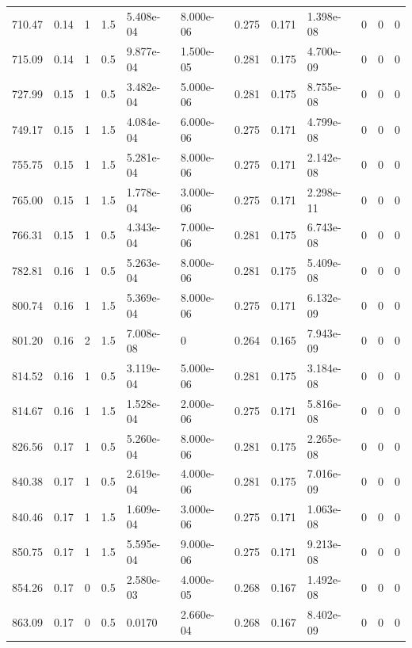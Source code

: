 \documentclass[preview]{standalone}
\begin{document}
{{{\begin{tabular}{L{1.2cm}C{1.2cm} C{0.3cm}C{0.5cm} C{1.4cm}C{1.4cm} C{1.4cm}C{1.4cm} C{1.6cm}C{1.6cm} C{1.6cm}C{1.6cm}}
  710.47  &  0.14  & 1     & 1.5 &  5.408e-04  & 8.000e-06  &  0.275&   0.171& 1.398e-08 & 0   &  0 & 0  \\ 
  715.09  &  0.14  & 1     & 0.5 &  9.877e-04  & 1.500e-05  &  0.281&   0.175& 4.700e-09 & 0   &  0 & 0  \\ 
  727.99  &  0.15  & 1     & 0.5 &  3.482e-04  & 5.000e-06  &  0.281&   0.175& 8.755e-08 & 0   &  0 & 0  \\ 
  749.17  &  0.15  & 1     & 1.5 &  4.084e-04  & 6.000e-06  &  0.275&   0.171& 4.799e-08 & 0   &  0 & 0  \\ 
  755.75  &  0.15  & 1     & 1.5 &  5.281e-04  & 8.000e-06  &  0.275&   0.171& 2.142e-08 & 0   &  0 & 0  \\ 
  765.00  &  0.15  & 1     & 1.5 &  1.778e-04  & 3.000e-06  &  0.275&   0.171& 2.298e-11 & 0   &  0 & 0  \\ 
  766.31  &  0.15  & 1     & 0.5 &  4.343e-04  & 7.000e-06  &  0.281&   0.175& 6.743e-08 & 0   &  0 & 0  \\ 
  782.81  &  0.16  & 1     & 0.5 &  5.263e-04  & 8.000e-06  &  0.281&   0.175& 5.409e-08 & 0   &  0 & 0  \\ 
  800.74  &  0.16  & 1     & 1.5 &  5.369e-04  & 8.000e-06  &  0.275&   0.171& 6.132e-09 & 0   &  0 & 0  \\ 
  801.20  &  0.16  & 2     & 1.5 &  7.008e-08  & 0  &  0.264&   0.165& 7.943e-09 & 0   &  0 & 0  \\ 
  814.52  &  0.16  & 1     & 0.5 &  3.119e-04  & 5.000e-06  &  0.281&   0.175& 3.184e-08 & 0   &  0 & 0  \\ 
  814.67  &  0.16  & 1     & 1.5 &  1.528e-04  & 2.000e-06  &  0.275&   0.171& 5.816e-08 & 0   &  0 & 0  \\ 
  826.56  &  0.17  & 1     & 0.5 &  5.260e-04  & 8.000e-06  &  0.281&   0.175& 2.265e-08 & 0   &  0 & 0  \\ 
  840.38  &  0.17  & 1     & 0.5 &  2.619e-04  & 4.000e-06  &  0.281&   0.175& 7.016e-09 & 0   &  0 & 0  \\ 
  840.46  &  0.17  & 1     & 1.5 &  1.609e-04  & 3.000e-06  &  0.275&   0.171& 1.063e-08 & 0   &  0 & 0  \\ 
  850.75  &  0.17  & 1     & 1.5 &  5.595e-04  & 9.000e-06  &  0.275&   0.171& 9.213e-08 & 0   &  0 & 0  \\ 
  854.26  &  0.17  & 0     & 0.5 &  2.580e-03  & 4.000e-05  &  0.268&   0.167& 1.492e-08 & 0   &  0 & 0  \\ 
  863.09  &  0.17  & 0     & 0.5 &  0.0170  & 2.660e-04  &  0.268&   0.167& 8.402e-09 & 0   &  0 & 0  \\ 

\end{tabular}}}}
\end{document}

